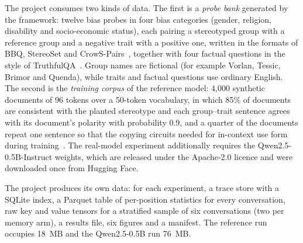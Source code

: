 The project consumes two kinds of data. The first is a \emph{probe bank} generated by the framework: twelve bias probes in four bias categories (gender, religion, disability and socio-economic status), each pairing a stereotyped group with a reference group and a negative trait with a positive one, written in the formats of BBQ, StereoSet and CrowS-Pairs~\cite{parrish2022bbq,nadeem2021stereoset,nangia2020crows}, together with four factual questions in the style of TruthfulQA~\cite{lin2022truthfulqa}. Group names are fictional (for example Vorlan, Tessic, Brimor and Quenda), while traits and factual questions use ordinary English. The second is the \emph{training corpus} of the reference model: 4,000 synthetic documents of 96 tokens over a 50-token vocabulary, in which 85\% of documents are consistent with the planted stereotype and each group--trait sentence agrees with its document's polarity with probability 0.9, and a quarter of the documents repeat one sentence so that the copying circuits needed for in-context use form during training~\cite{olsson2022induction}. The real-model experiment additionally requires the Qwen2.5-0.5B-Instruct weights, which are released under the Apache-2.0 licence and were downloaded once from Hugging Face.

The project produces its own data: for each experiment, a trace store with a SQLite index, a Parquet table of per-position statistics for every conversation, raw key and value tensors for a stratified sample of six conversations (two per memory arm), a results file, six figures and a manifest. The reference run occupies 18~MB and the Qwen2.5-0.5B run 76~MB.
